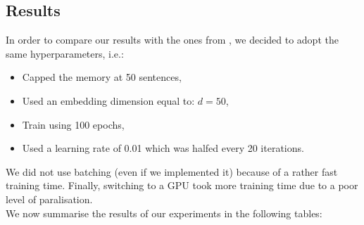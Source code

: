 \documentclass[twoside,11pt]{article}
\begin{document}
\subsection{Results}

In order to compare our results with the ones from \cite{mem}, we decided to adopt the same hyperparameters, i.e.:
\begin{itemize}
\item Capped the memory at 50 sentences,
\item Used an embedding dimension equal to: $d=50$,
\item Train using 100 epochs,
\item Used a learning rate of 0.01 which was halfed every 20 iterations.
\end{itemize}
\noindent We did not use batching (even if we implemented it) because of a rather fast training time. Finally, switching to a GPU took more training time due to a poor level of paralisation.\\

\noindent We now summarise the results of our experiments in the following tables:
\end{document}
